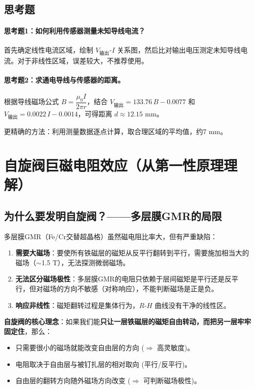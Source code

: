 \documentclass[12pt,a4paper]{article}
\begin{document}
\subsection{思考题}
\paragraph{思考题1：如何利用传感器测量未知导线电流？}
首先确定线性电流区域，绘制 \(V_{\text{输出}}\)-\(I\) 关系图，然后比对输出电压测定未知导线电流。对于非线性区域，误差较大，不推荐使用。

\paragraph{思考题2：求通电导线与传感器的距离。}
根据导线磁场公式 \(B = \dfrac{\mu_0 I}{2\pi r}\)，结合 \(V_{\text{输出}} = 133.76\,B - 0.0077\) 和 \(V_{\text{输出}} = 0.0022\,I - 0.0014\)，可得距离 \(d \approx 12.15\) mm。

更精确的方法：利用测量数据逐点计算，取合理区域的平均值，约7 mm。

\section{自旋阀巨磁电阻效应（从第一性原理理解）}

\subsection{为什么要发明自旋阀？——多层膜GMR的局限}
多层膜GMR（Fe/Cr交替超晶格）虽然磁电阻比率大，但有严重缺陷：
\begin{enumerate}
    \item \textbf{需要大磁场}：要使所有铁磁层的磁矩从反平行翻转到平行，需要施加相当大的磁场（$\sim$1.5 T），无法探测微弱磁场。
    \item \textbf{无法区分磁场极性}：多层膜GMR的电阻只依赖于层间磁矩是平行还是反平行，但对磁场的方向不敏感（对称响应），不能判断磁场是正是负。
    \item \textbf{响应非线性}：磁矩翻转过程是集体行为，$R$-$H$ 曲线没有干净的线性区。
\end{enumerate}
\textbf{自旋阀的核心理念}：如果我们能\textbf{只让一层铁磁层的磁矩自由转动，而把另一层牢牢固定住}，那么：
\begin{itemize}
    \item 只需要很小的磁场就能改变自由层的方向 ($\Rightarrow$ 高灵敏度)。
    \item 电阻取决于自由层与被钉扎层的相对取向 (平行/反平行)。
    \item 自由层的翻转方向随外磁场方向改变 ($\Rightarrow$ 可判断磁场极性)。
\end{itemize}
\end{document}

